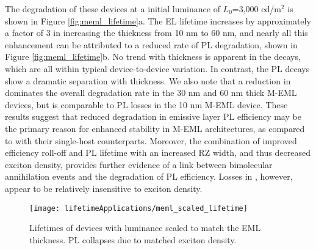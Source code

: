 \documentclass[../thesis.tex]{subfiles}
\begin{document}
The degradation of these devices at a initial luminance of $L_0$=3,000 cd/m$^2$ is shown in Figure \ref{fig:meml_lifetime}a.
The EL lifetime increases by approximately a factor of 3 in increasing the thickness from 10 nm to 60 nm, and nearly all this enhancement can be attributed to a reduced rate of PL degradation, shown in Figure \ref{fig:meml_lifetime}b.
No trend with thickness is apparent in the \ef decays, which are all within typical device-to-device variation. 
In contrast, the PL decays show a dramatic separation with thickness. 
We also note that a reduction in \ef dominates the overall degradation rate in the 30 nm and 60 nm thick M-EML devices, but is comparable to PL losses in the 10 nm M-EML device. 
These results suggest that reduced degradation in emissive layer PL efficiency may be the primary reason for enhanced stability in M-EML architectures, as compared to with their single-host counterparts. 
Moreover, the combination of improved efficiency roll-off and PL lifetime with an increased RZ width, and thus decreased exciton density, provides further evidence of a link between bimolecular annihilation events and the degradation of PL efficiency. \supercite{Schmidbauer2013}
Losses in \ef, however, appear to be relatively insensitive to exciton density.

\begin{wrapfigure}{r}{.4\textwidth}
\centering
\texttt{[image: lifetimeApplications/meml\_scaled\_lifetime]}
\caption{Lifetimes of devices with luminance scaled to match the EML thickness. PL collapses due to matched exciton density.}
\label{fig:meml_scaled_lifetime}
\end{wrapfigure}
\end{document}
